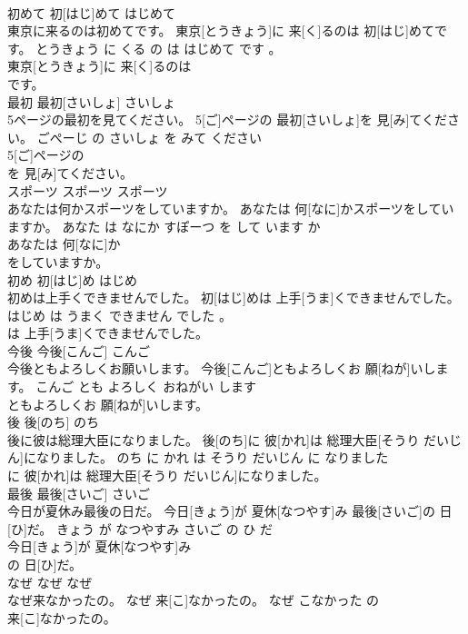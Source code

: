 \documentclass[8pt]{extreport}
\begin{document}
\begin{CJK}{UTF8}{min}
\\	初めて	初[はじ]めて	はじめて	
\\	東京に来るのは初めてです。	東京[とうきょう]に 来[く]るのは 初[はじ]めてです。	とうきょう に くる の は はじめて です 。	
\\	東京[とうきょう]に 来[く]るのは
\\	です。			
\\	最初	最初[さいしょ]	さいしょ	
\\	5ページの最初を見てください。	5[ご]ページの 最初[さいしょ]を 見[み]てください。	ごぺーじ の さいしょ を みて ください	
\\	5[ご]ページの
\\	を 見[み]てください。			
\\	スポーツ	スポーツ	スポーツ	
\\	あなたは何かスポーツをしていますか。	あなたは 何[なに]かスポーツをしていますか。	あなた は なにか すぽーつ を して います か	
\\	あなたは 何[なに]か
\\	をしていますか。			
\\	初め	初[はじ]め	はじめ	
\\	初めは上手くできませんでした。	初[はじ]めは 上手[うま]くできませんでした。	はじめ は うまく できません でした 。	
\\	は 上手[うま]くできませんでした。			
\\	今後	今後[こんご]	こんご	
\\	今後ともよろしくお願いします。	今後[こんご]ともよろしくお 願[ねが]いします。	こんご とも よろしく おねがい します	
\\	ともよろしくお 願[ねが]いします。			
\\	後	後[のち]	のち	
\\	後に彼は総理大臣になりました。	後[のち]に 彼[かれ]は 総理大臣[そうり だいじん]になりました。	のち に かれ は そうり だいじん に なりました	
\\	に 彼[かれ]は 総理大臣[そうり だいじん]になりました。			
\\	最後	最後[さいご]	さいご	
\\	今日が夏休み最後の日だ。	今日[きょう]が 夏休[なつやす]み 最後[さいご]の 日[ひ]だ。	きょう が なつやすみ さいご の ひ だ	
\\	今日[きょう]が 夏休[なつやす]み
\\	の 日[ひ]だ。			
\\	なぜ	なぜ	なぜ	
\\	なぜ来なかったの。	なぜ 来[こ]なかったの。	なぜ こなかった の	
\\	来[こ]なかったの。			

\end{CJK}
\end{document}
